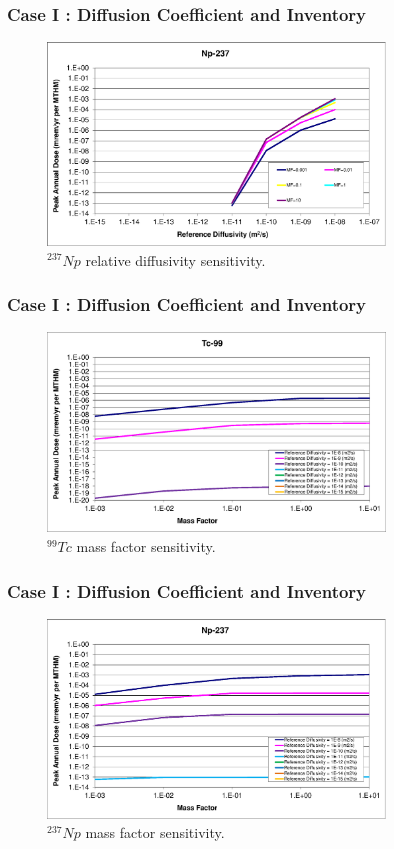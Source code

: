 \begin{frame}[c]
  \frametitle{Case I : Diffusion Coefficient and Inventory}
\begin{figure}[ht!]
\centering
\includegraphics[width=0.8\textwidth]{DiffCoeffAndInvEBSFail/Np-237.eps}
\caption{$^{237}Np$ relative diffusivity sensitivity.} 
\label{fig:DCInvNp237}
\end{figure}
\end{frame}

\begin{frame}[c]
  \frametitle{Case I : Diffusion Coefficient and Inventory}

\begin{figure}[ht!]
\centering
\includegraphics[width=0.8\textwidth]{DiffCoeffAndInvEBSFail/Tc-99-MF.eps}
\caption{$^{99}Tc$ mass factor sensitivity.}
\label{fig:DCInvTc99MF}
\end{figure}
\end{frame}

\begin{frame}[c]
  \frametitle{Case I : Diffusion Coefficient and Inventory}

\begin{figure}[ht!]
\centering
\includegraphics[width=0.8\textwidth]{DiffCoeffAndInvEBSFail/Np-237-MF.eps}
\caption{$^{237}Np$ mass factor sensitivity.}
\label{fig:DCInvNp237MF}
\end{figure}
\end{frame}
